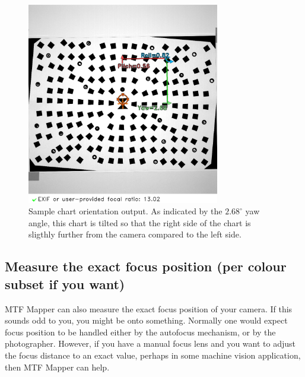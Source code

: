 \documentclass[a4paper]{article}
\begin{document}
\begin{figure}[!ht]
\centering
\includegraphics[width=0.75\textwidth]{figures/orientation_example}
\caption{Sample chart orientation output. As indicated by the $2.68^\circ$
yaw angle, this chart is tilted so that the right side of the chart is sligthly further
from the camera compared to the left side.}
\label{fig:chart_orientation_example}
\end{figure}

\newpage

\subsection{Measure the exact focus position (per colour subset if you want)}
\label{sec:focus_distance}
MTF Mapper can also measure the exact focus position of your camera. If this
sounds odd to you, you might be onto something. Normally one would expect focus
position to be handled either by the autofocus mechanism, or by the
photographer. However, if you have a manual focus lens and you want to
adjust the focus distance to an exact value, perhaps in some machine vision
application, then MTF Mapper can help. 
\end{document}
